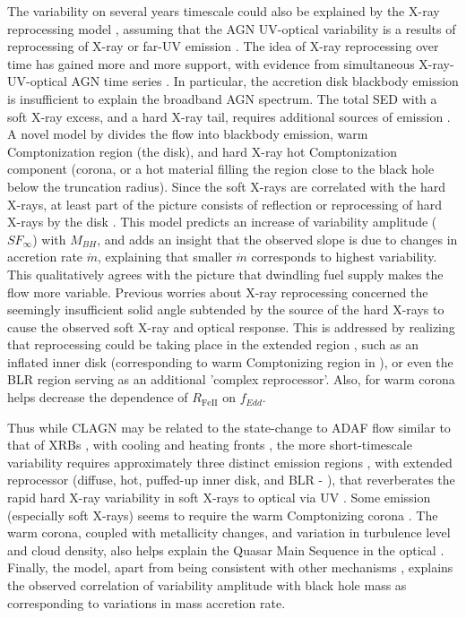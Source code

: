 \documentclass[twocolumn]{aastex62}
\begin{document}
The variability on several years timescale could also be explained by the X-ray reprocessing model \cite{kokubo2015, kubota2018}, assuming that the AGN UV-optical variability is a results of reprocessing of X-ray or far-UV emission \citep{krolik1991}.  The idea of X-ray reprocessing  over time has gained more and more support, with evidence from simultaneous X-ray-UV-optical AGN time series \citep{edelson2014, mchardy2018,  zhu2018}. In particular, the accretion disk blackbody emission is insufficient to explain the broadband AGN spectrum. The total SED with a soft X-ray excess, and a hard X-ray tail, requires additional sources of emission \citep{kubota2018}. A novel model by \citet{kubota2018} divides the flow into blackbody emission, warm Comptonization region (the disk), and hard X-ray hot Comptonization component (corona, or a hot material filling the region close to the black hole below the truncation radius).  Since the soft X-rays are correlated with the hard X-rays, at least part of the picture consists of reflection or reprocessing of hard X-rays by the disk \citep{lawrence2018}. This model predicts an increase of variability amplitude ($SF_{\infty}$) with $M_{BH}$, and adds an insight that the observed slope is due to changes in accretion rate $\dot{m}$, explaining that smaller $\dot{m}$ corresponds to highest variability. This qualitatively agrees with the picture that dwindling fuel supply makes the flow more variable. Previous worries about X-ray reprocessing concerned the seemingly insufficient solid angle subtended by the source of the hard X-rays to cause the observed soft X-ray and optical response. This is addressed by realizing that reprocessing could be taking place in the extended region \citep{gardner2017}, such as an inflated inner disk (corresponding to warm Comptonizing region in \citet{kubota2018}), or even the BLR region serving as an additional 'complex reprocessor'\citep{mchardy2018}. Also, for \citet{panda2019a} warm corona helps decrease the dependence of $R_{\mathrm{Fe  II}}$ on $f_{Edd}$. 

Thus while CLAGN may be related to the state-change to ADAF flow \citep{sniegowska2019} similar to that of XRBs \citep{noda2018,ruan2019}, with cooling and heating fronts \citep{ross2018}, the more short-timescale variability requires approximately three distinct emission regions \citep{kubota2018}, with extended reprocessor (diffuse, hot, puffed-up inner disk, and BLR - \citealt{mchardy2018}), that reverberates the rapid hard X-ray variability in soft X-rays to optical via UV \citep{fausnaugh2018}. Some emission (especially soft X-rays) seems to require the warm Comptonizing corona \citet{kubota2018}. The warm corona, coupled with metallicity changes, and variation in turbulence level and cloud density, also helps explain the Quasar Main Sequence in the optical \citep{panda2019a,panda2019b}. Finally, the \citet{kubota2018} model, apart from being consistent with other mechanisms \citep{mchardy2018, panda2019a, sniegowska2019, lawrence2018, ross2018, ruan2019}, explains the observed correlation of variability amplitude with black hole mass as corresponding to variations in mass accretion rate. 
\end{document}
